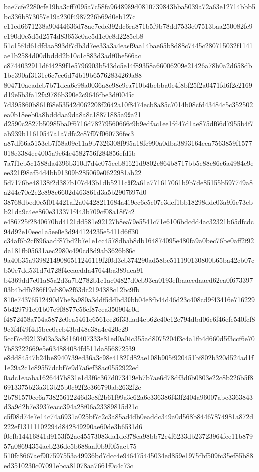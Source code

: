 \documentclass[11pt,a4paper]{article}
\begin{document}
{bae7cfe2280cfe19ba3cff7095a7c58fa9648989d0810739843bba5039a72a63e12714bbb5bc336b873057e19a230f4987226b69d0eb127c
e11ed6671238a90444636d78ae7ede392dc6ca871b5f9b78dd7533e07513baa250082fc9e190d0c5d5d2574d83653e0ac5d1c0e8d2285eb8
51c15f4d61dfdaa893df7db3d7ee33a3a4eaef9aa14bae65b8d88c7445c280715032f1141ae1b2584d00dbddd2b10c1c883d3adf0be566ac
c8744032911df44289f1e5796903b543dc5e14f89358a66006209e21426a78b0a2d658db1bc390af3131e6c7ee6d74b19b65762834269a88
804710aeadcb7b71dca6e98a0036a8e98e9ea710b4bebba0e4f8bf25f2a0471fd6f2c2169d19e5b3fa12fa9786b390e2c9646fbe3df0045c
7d395860b861f68e53542d062208f2642a10f8474ecb8a85c7014b08cfd43484c5c352502ea0b18eeb0a8bdddaa9da8a8c18871885a99a21
d2590c2827b50985ba0f6716d78279560666c9b9edfac1ee1fd47d1ae875df66d7955b4f7ab939b11610547a1a7dfc2c87f97f060736fec3
a87df66a5153eb7f58a09c11a9b7326308f995a18fc990a0dba3893164eea7563859f1577018e3384ec4005a9e64e4582756f284856efd6b
7a7f1eb5c1588da4396b310d7d4e075eeb81621d9802c864b8717bb5e88c86c6a4984c9eee321f98af54d4bb91309b285069e0622981ab22
5d7176be48138f2d387b107d43b1db5211c9f2a61a771617061b9b7de85155b597749a8a244e70e2e2c898c6602d463861d3a5b2907697d0
38768dbed0c5f014421af2a04428211684a419ec6c5c07e3def1bb18298ddc03a9f6c73cbb21da9c4ee860e313371f443b709cf08a18f7c2
e486725f2840670bd4121dd581e92127b8ea79e5541c71e6106bdcdd4ac32321b65dfcdc94d92e10eec1a5ee0e3d944124235e5411d6ff30
c34af6b2cf896aadf87bd2b7e1e1cc4578dbab8db164874095e480fa9a0bec76be0aff2f92da181fb05631aec2980c490cd8d9ab3626b86c
9a40b35a93982149086511246119f2f0d3cb374290ad58bc511190130800b65ba42cb07cb50e7dd531d7d728f4eeacdda47644ba389dca91
b4369dd7c01a85a2d3a7b2782b1c1ac04827d0cb93ca0193efbaaccdaacd62ea0f67339703b4bdfb286f19cb80e2f63dc2194388c12bc9fb
810e74376512490d7be8a980a3ddf5ddbd30bb04e8fb44d46d23c408cd9f43416e7162295b429791c01b07e9f8877c56ef87cea350904e0d
f4872458a754a5872e0ea5461c6561ee26f33dad4cb62c40e12e794dbd06c6f46efe540fcf89c3f4f49f4d5bce0ccb43bd48c38a4c420c29
5ccf7cd9213b03a3a8d160407333e81ed0a04c355ad8075204f3c4a1fb4d660d5f3ccf6e707b83222669e5e634884084fd511da856872539
e8dd84547b24be8940739ed36a3c98e41820d82ae108b905f920451bf802b320d524ad1f1e29a2c1c89557dcbf7e9d7a6ef38ac0552922ed
0adc1eaaba1626447b831e1d3f6c367d073419eb7b7ae6d78df3d6b0803e22c8b226b5f86913375b23a313b25b0c92f2e366790ab2632f2c
2b781570ce6a73825612246d3c8f2b61f99a3c62a6e336386f43f2404a96007abc3363843d3a9d2b7e3937eacc394a28f06a23389815d21c
c5f08d74e7e14c74a6931a025bf7c2c3a85ad4db0eaddc349a0d568b84467874981a872d222ef13111102294d842849290ae60de3b6531d6
f0efb14416841d9153f52ae45573083da1de378ca98bb72c4f6233db23723964fee11b87957a08694354acb236de5b688aaf0b9f0f5acb75
510fc8667aef907597553a49936bd7dcc4e946475445034ed859e1975fbf509fc35ef85b88ed3510230c07091ebca81078aa7661f0c4c73c
}
\end{document}
